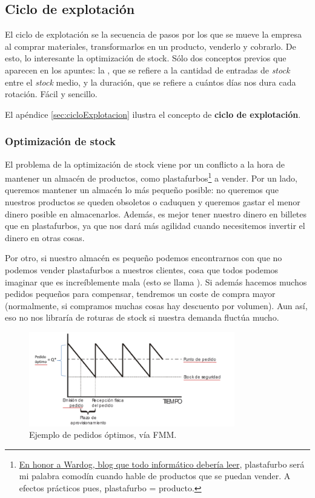 \documentclass[nochap,palatino,shortheader]{apuntes}
\newcommand{\study}[1]{#1} \newcommand{\substudy}[1]{#1}
\begin{document}
\subsection{Ciclo de explotación}

El ciclo de explotación se la secuencia de pasos por los que se mueve la empresa al comprar materiales, transformarlos en un producto, venderlo y cobrarlo. De esto, lo interesante la \study{optimización de stock}.
Sólo dos conceptos previos que aparecen en los apuntes: la , que se refiere a la cantidad de entradas de \textit{stock} entre el \textit{stock} medio, y la \study{duración}, que se refiere a cuántos días nos dura cada rotación. Fácil y sencillo.

El apéndice \ref{sec:cicloExplotacion} ilustra el concepto de \textbf{ciclo de explotación}.

\subsubsection{Optimización de stock}

El problema de la optimización de stock viene por un conflicto a la hora de mantener un almacén de productos, como plastafurbos\footnote{\href{http://mundowdg.com/blog/2009/04/16/adioshola/}{En honor a Wardog, blog que todo informático debería leer}, plastafurbo será mi palabra comodín cuando hable de productos que se puedan vender. A efectos prácticos pues, plastafurbo = producto.} a vender.
Por un lado, queremos mantener un almacén lo más pequeño posible: no queremos que nuestros productos se queden obsoletos o caduquen y queremos gastar el menor dinero posible en almacenarlos.
Además, es mejor tener nuestro dinero en billetes que en plastafurbos, ya que nos dará más agilidad cuando necesitemos invertir el dinero en otras cosas.

Por otro, si nuestro almacén es pequeño podemos encontrarnos con que no podemos vender plastafurbos a nuestros clientes, cosa que todos podemos imaginar que es increíblemente mala (esto se llama ).
Si además hacemos muchos pedidos pequeños para compensar, tendremos un coste de compra mayor (normalmente, si compramos muchas cosas hay descuento por volumen). Aun así, eso no nos libraría de roturas de stock si nuestra demanda fluctúa mucho.

\begin{figure}[hbtp]
\centering
\includegraphics[width=0.8\textwidth]{img/ControlStock.png}
\caption{Ejemplo de pedidos óptimos, vía FMM.}
\label{fig:StockDeterminista}
\end{figure}
\end{document}
